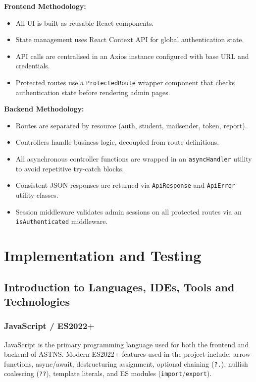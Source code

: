 \documentclass[12pt,a4paper]{report}
\begin{document}
\textbf{Frontend Methodology:}
\begin{itemize}
  \item All UI is built as reusable React components.
  \item State management uses React Context API for global authentication state.
  \item API calls are centralised in an Axios instance configured with base URL and credentials.
  \item Protected routes use a \texttt{ProtectedRoute} wrapper component that checks authentication state before rendering admin pages.
\end{itemize}

\textbf{Backend Methodology:}
\begin{itemize}
  \item Routes are separated by resource (auth, student, mailsender, token, report).
  \item Controllers handle business logic, decoupled from route definitions.
  \item All asynchronous controller functions are wrapped in an \texttt{asyncHandler} utility to avoid repetitive try-catch blocks.
  \item Consistent JSON responses are returned via \texttt{ApiResponse} and \texttt{ApiError} utility classes.
  \item Session middleware validates admin sessions on all protected routes via an \texttt{isAuthenticated} middleware.
\end{itemize}

\chapter{Implementation and Testing}

\section{Introduction to Languages, IDEs, Tools and Technologies}

\subsection{JavaScript / ES2022+}
JavaScript is the primary programming language used for both the frontend and backend of ASTNS. Modern ES2022+ features used in the project include: arrow functions, async/await, destructuring assignment, optional chaining (\texttt{?.}), nullish coalescing (\texttt{??}), template literals, and ES modules (\texttt{import}/\texttt{export}).
\end{document}
